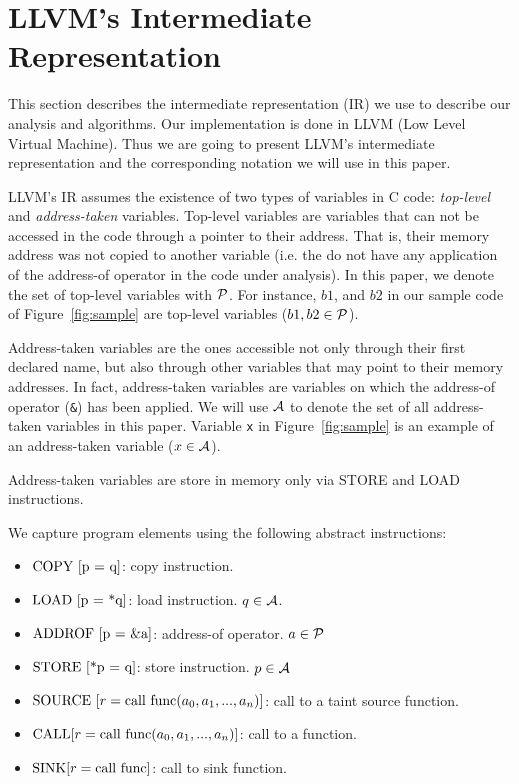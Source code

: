 \section{LLVM's Intermediate Representation}\label{sec:llvm}

This section describes the intermediate representation (IR)
we use to describe our analysis and algorithms.
Our implementation is done in LLVM \cite{Lattner:2004:LLVM}
(Low Level Virtual Machine). Thus we are going to present
LLVM's intermediate representation and the corresponding
notation we will use in this paper.

LLVM's IR assumes the existence of two types of variables
in C code: \textit{top-level} and \textit{address-taken}
variables.
Top-level variables are variables that can not be accessed
in the code through a pointer to their address. That is,
their memory address was not copied to another variable
(i.e. the do not have any application of the address-of
operator in the code under analysis). In this paper, we
denote the set of top-level variables with $\mathcal{P}$.
For instance, $b1$, and $b2$ in our sample code of
Figure~\ref{fig:sample} are top-level
variables ($b1, b2 \in \mathcal{P}$).

Address-taken variables are the ones accessible not
only through their first declared name, but also through
other variables that may point to their memory addresses.
In fact, address-taken variables are variables on which the
address-of operator (\texttt{\&}) has been applied. We
will use $\mathcal{A}$ to denote the set of all address-taken
variables in this paper.
Variable \texttt{x} in Figure~\ref{fig:sample} is an example
of an address-taken variable ($x \in \mathcal{A}$).

Address-taken variables are store in memory only via
STORE and LOAD instructions.

We capture program elements using the following abstract
instructions:
\begin{itemize}
\item $\copydef{}$: copy instruction.
\item $\loaddef{}$: load instruction. $q \in \mathcal{A}$.
\item $\addrofdef{}$: address-of operator. $a \in \mathcal{P}$
\item $\storedef{}$: store instruction. $p \in \mathcal{A}$
\item $\text{SOURCE}\ [r = \text{call}\ \text{func}(a_0, a_1, ..., a_n)]{}$: call to a taint source function.
\item $\text{CALL} [r = \text{call}\ \text{func}(a_0, a_1, ..., a_n)]{}$: call to a function.
\item $\text{SINK} [r = \text{call}\ \text{func}]{}$: call to sink function.
\end{itemize}